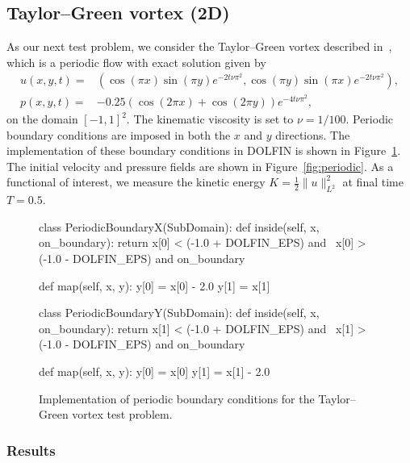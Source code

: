 \subsection{Taylor--Green vortex (2D)}

As our next test problem, we consider the Taylor--Green vortex
described in~\cite{Canuto07}, which is a periodic flow with exact
solution given by
\begin{equation}\label{eq:periodic}
  \begin{split}
    u(x,y,t) = & (\cos (\pi x) \sin (\pi y)  e^{-2t\nu\pi^2}, \cos (\pi y)  \sin (\pi x)  e^{-2t\nu\pi^2}), \\
    p(x,y,t) = & -0.25(\cos(2\pi x ) + \cos(2\pi y ))  e^{-4t\nu\pi^2},
  \end{split}
\end{equation}
on the domain $[-1, 1]^{2}$. The kinematic viscosity is set to $\nu =
1/100$. Periodic boundary conditions are imposed in both the $x$ and
$y$ directions. The implementation of these boundary conditions in
DOLFIN is shown in Figure~\ref{fig:periodic_bcs}. The initial velocity
and pressure fields are shown in Figure~\ref{fig:periodic}. As a
functional of interest, we measure the kinetic energy $K = \frac{1}{2}
\|u\|^2_{L^2}$ at final time $T = 0.5$.

\begin{figure}[htbp]
  \codesize
  \begin{center}
    \begin{python}
class PeriodicBoundaryX(SubDomain):
    def inside(self, x, on_boundary):
        return x[0] < (-1.0 + DOLFIN_EPS) and \
               x[0] > (-1.0 - DOLFIN_EPS) and on_boundary

    def map(self, x, y):
        y[0] = x[0] - 2.0
        y[1] = x[1]

class PeriodicBoundaryY(SubDomain):
    def inside(self, x, on_boundary):
        return x[1] < (-1.0 + DOLFIN_EPS) and \
               x[1] > (-1.0 - DOLFIN_EPS) and on_boundary

    def map(self, x, y):
        y[0] = x[0]
        y[1] = x[1] - 2.0
    \end{python}
    \caption{Implementation of periodic boundary conditions for the
      Taylor--Green vortex test problem.}
    \label{fig:periodic_bcs}
  \end{center}
\end{figure}

\subsubsection{Results}

